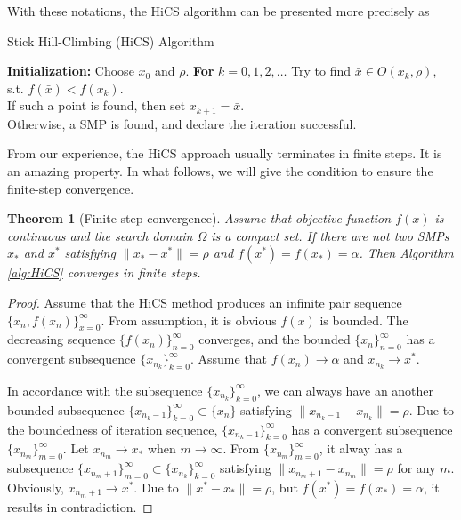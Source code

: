\documentclass[final,1p,times]{elsarticle}
\newtheorem{theorem}{Theorem}
\begin{document}
With these notations, the HiCS algorithm can be presented
more precisely as 
\begin{algorithm}[H]
	\caption{Stick Hill-Climbing (HiCS) Algorithm}
	\label{alg:HiCS}
\begin{algorithmic}[1]
	\STATE \textbf{Initialization:} Choose $x_0$ and $\rho$.
	\STATE \textbf{For} $k=0,1,2,\dots$
	\STATE \hspace{0.5cm} Try to find $\bar{x}\in O(x_k, \rho)$,
		   s.t. $f(\bar x)<f(x_k)$.
			\\
		 \hspace{0.5cm} If such a point is found, then set
		 $x_{k+1}= \bar{x}$.
		  \\
		   \hspace{0.5cm} Otherwise, a SMP is found, 
		   and declare the iteration successful.
\end{algorithmic}
\end{algorithm}



From our experience, the HiCS approach usually terminates in 
finite steps. It is an amazing property. In what follows, we will
give the condition to ensure the finite-step convergence.

\begin{theorem}[Finite-step convergence]
	\label{thm:fsc}
	Assume that objective function $f(x)$ is continuous and the
	search domain $\Omega$ is a compact set.
	If there are not two SMPs $x_*$ and $x^*$ satisfying 
	$\|x_*-x^*\|=\rho$ and $f(x^*)=f(x_*)=\alpha$.
	Then Algorithm \ref{alg:HiCS} converges in finite steps.
\end{theorem}
\begin{proof}
	Assume that the HiCS method produces an infinite pair sequence
	$\{x_n, f(x_n)\}_{x=0}^{\infty}$. From assumption,
	it is obvious $f(x)$ is bounded. The decreasing sequence
	$\{f(x_n)\}_{n=0}^\infty$ converges, and the bounded
	$\{x_n\}_{n=0}^\infty$ has a convergent subsequence 
	$\{x_{n_k}\}_{k=0}^\infty$. Assume that $f(x_n)\rightarrow
	\alpha$ and $x_{n_k}\rightarrow x^*$. 
	
	In accordance with the subsequence
	$\{x_{n_k}\}_{k=0}^\infty$, we can always have an another
	bounded subsequence $\{x_{n_k -1}\}_{k=0}^\infty \subset
	\{x_n\}$ satisfying $\|x_{n_k - 1}-x_{n_k}\|=\rho$. 
	Due to the boundedness of iteration
	sequence, $\{x_{n_k-1}\}_{k=0}^\infty$ has a convergent
	subsequence $\{x_{n_{m}}\}_{m=0}^\infty$. Let $x_{n_m}
	\rightarrow x_*$ when $m\rightarrow \infty$. 
	From $\{x_{n_{m}}\}_{m=0}^\infty$, it alway has a subsequence 
	$\{x_{n_{m}+1}\}_{m=0}^\infty\subset\{x_{n_k}\}_{k=0}^\infty$
	satisfying $\|x_{n_{m}+1}-x_{n_m}\| = \rho$ for any $m$.
	Obviously, $x_{n_{m}+1}\rightarrow x^*$.
	Due to $\|x^*-x_*\|=\rho$, but $f(x^*)=f(x_*)=\alpha$,
	it results in contradiction.
\end{proof}
\end{document}
